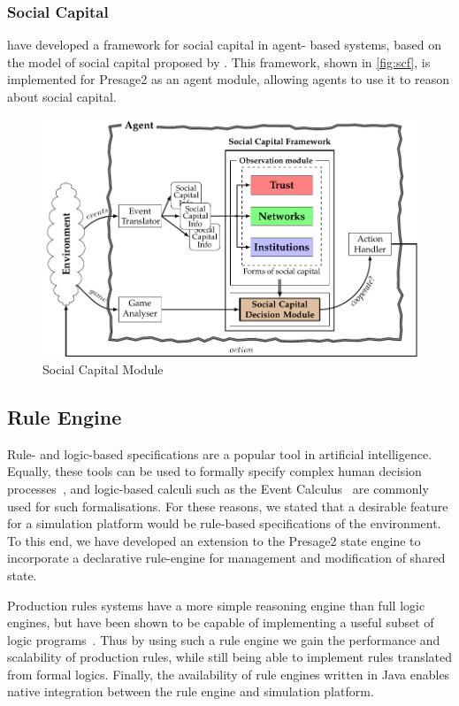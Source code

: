 \subsubsection*{Social Capital}

\citet{Petruzzi2014} have developed a framework for social capital in agent-
based systems, based on the model of social capital proposed by
\citet{ostromahn2003}. This framework, shown in \autoref{fig:scf}, is
implemented for Presage2 as an agent module, allowing agents to use it to
reason about social capital.

\begin{figure}[htb]
\caption[Social Capital Module]{Social Capital Module~\citep{Petruzzi2014}}
\label{fig:scf}
\includegraphics[width=\linewidth]{gfx/SCF2}
\end{figure}

\subsection{Rule Engine}

Rule- and logic-based specifications are a popular tool in artificial
intelligence. Equally, these tools can be used to formally specify complex
human decision processes~\citep{Pitt2005a}, and logic-based calculi such as
the Event Calculus~\citep{Kowalski1986} are commonly used for such
formalisations. For these reasons, we stated that a desirable feature for a
simulation platform would be rule-based specifications of the environment. To
this end, we have developed an extension to the Presage2 state engine to
incorporate a declarative rule-engine for management and modification of shared
state.

Production rules systems have a more simple reasoning engine than full logic
engines, but have been shown to be capable of implementing a useful subset of
logic programs~\citep{Bragaglia2012}. Thus by using such a rule engine we gain
the performance and scalability of production rules, while still being able to
implement rules translated from formal logics. Finally, the availability of rule
engines written in Java enables native integration between the rule engine and
simulation platform.

